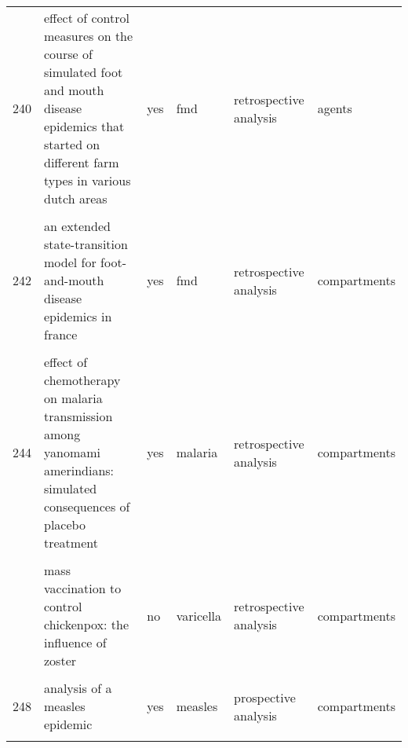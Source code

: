 \documentclass[
]{article}
\begin{document}
\begin{landscape}
\begin{longtable}{l>{\raggedright\arraybackslash}p{3.3cm}l>{\raggedright\arraybackslash}p{3.3cm}>{\raggedright\arraybackslash}p{2cm}l}
240 & effect of control measures on the course of simulated foot and mouth disease epidemics that started on different farm types in various dutch areas & yes & fmd & retrospective analysis & agents\\
\addlinespace
\cellcolor{gray!6}{241} & \cellcolor{gray!6}{dynamics of the 2001 uk foot and mouth epidemic: stochastic dispersal in a heterogeneous landscape} & \cellcolor{gray!6}{yes} & \cellcolor{gray!6}{fmd} & \cellcolor{gray!6}{prospective analysis} & \cellcolor{gray!6}{agents}\\
242 & an extended state-transition model for foot-and-mouth disease epidemics in france & yes & fmd & retrospective analysis & compartments\\
\cellcolor{gray!6}{243} & \cellcolor{gray!6}{simulated economic consequences of foot-and-mouth disease epidemics and their public control in france} & \cellcolor{gray!6}{yes} & \cellcolor{gray!6}{fmd} & \cellcolor{gray!6}{retrospective analysis} & \cellcolor{gray!6}{compartments}\\
244 & effect of chemotherapy on malaria transmission among yanomami amerindians: simulated consequences of placebo treatment & yes & malaria & retrospective analysis & compartments\\
\cellcolor{gray!6}{245} & \cellcolor{gray!6}{modelling vaccination strategy against directly transmitted diseases using a series of pulses} & \cellcolor{gray!6}{yes} & \cellcolor{gray!6}{rubella} & \cellcolor{gray!6}{prospective analysis} & \cellcolor{gray!6}{compartments}\\
\addlinespace
246 & mass vaccination to control chickenpox: the influence of zoster & no & varicella & retrospective analysis & compartments\\
\cellcolor{gray!6}{247} & \cellcolor{gray!6}{an evaluation of alternate control strategies for foot-and-mouth disease in australia: a regional approach} & \cellcolor{gray!6}{yes} & \cellcolor{gray!6}{fmd} & \cellcolor{gray!6}{prospective analysis} & \cellcolor{gray!6}{agents}\\
248 & analysis of a measles epidemic & yes & measles & prospective analysis & compartments\\
\cellcolor{gray!6}{249} & \cellcolor{gray!6}{a model of the transmission of dengue fever with an evaluation of the impact of ultra-low volume (ulv) insecticide applications on dengue epidemics} & \cellcolor{gray!6}{not applicable} & \cellcolor{gray!6}{dengue} & \cellcolor{gray!6}{prospective analysis} & \cellcolor{gray!6}{compartments}\\

\end{longtable}
\end{landscape}
\end{document}
